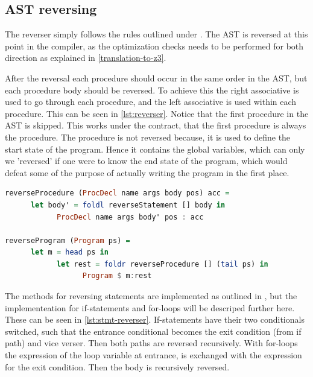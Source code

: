 
\subsection{AST reversing }
The reverser simply follows the rules outlined under . The AST is
reversed at this point in the compiler, as the optimization checks needs to be performed for both
direction as explained in \ref{translation-to-z3}.

After the reversal each procedure should occur in the same order in the AST, but each
procedure body should be reversed. To achieve this the right associative  is used to
go through each procedure, and the left associative  is used within each procedure.
This can be seen in \autoref{lst:reverser}. Notice that the first procedure in the AST is
skipped. This works under the contract, that the first procedure is always the 
procedure. The  procedure is not reversed because, it is used to define the start state
of the program. Hence it contains the global variables, which can only we 'reversed' if one were
to know the end state of the program, which would defeat some of the purpose of actually writing
the program in the first place.

\begin{lstlisting}[language=Haskell, label={lst:reverser}, caption={Reversing AST.}]
reverseProcedure (ProcDecl name args body pos) acc =
      let body' = foldl reverseStatement [] body in
            ProcDecl name args body' pos : acc

reverseProgram (Program ps) =
      let m = head ps in
            let rest = foldr reverseProcedure [] (tail ps) in
                  Program $ m:rest
\end{lstlisting}
\noindent
The methods for reversing statements are implemented as outlined in ,
but the implementeation for if-statements and for-loops will be descriped further here. These
can be seen in \autoref{lst:stmt-reverser}. If-statements have their two conditionals switched,
such that the entrance conditional becomes the exit condition (from if path) and vice verser.
Then both paths are reversed recursively. With for-loops the expression of the loop variable at
entrance, is exchanged with the expression for the exit condition. Then the body is recursively
reversed.

